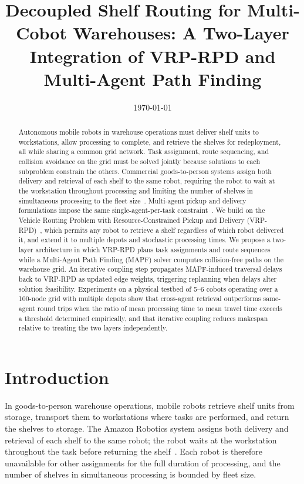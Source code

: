 \documentclass{article}
\title{Decoupled Shelf Routing for Multi-Cobot Warehouses: A Two-Layer Integration of VRP-RPD and Multi-Agent Path Finding}
\date{\today}
\begin{document}
\maketitle

\begin{abstract}

Autonomous mobile robots in warehouse operations must deliver shelf units to
workstations, allow processing to complete, and retrieve the shelves for
redeployment, all while sharing a common grid network. Task assignment, route
sequencing, and collision avoidance on the grid must be solved jointly because
solutions to each subproblem constrain the others. Commercial goods-to-person
systems assign both delivery and retrieval of each shelf to the same robot,
requiring the robot to wait at the workstation throughout processing and limiting
the number of shelves in simultaneous processing to the fleet
size~\cite{kiva_patent_2014}. Multi-agent pickup and delivery formulations
impose the same single-agent-per-task constraint~\cite{ma2017lifelong}. We build
on the Vehicle Routing Problem with Resource-Constrained Pickup and Delivery
(VRP-RPD)~\cite{vrp_rpd_gecco_2026}, which permits any robot to retrieve a
shelf regardless of which robot delivered it, and extend it to multiple depots
and stochastic processing times. We propose a two-layer architecture in which
VRP-RPD plans task assignments and route sequences while a Multi-Agent Path
Finding (MAPF) solver computes collision-free paths on the warehouse grid. An
iterative coupling step propagates MAPF-induced traversal delays back to VRP-RPD
as updated edge weights, triggering replanning when delays alter solution
feasibility. Experiments on a physical testbed of 5--6 cobots operating over a
100-node grid with multiple depots show that cross-agent retrieval outperforms
same-agent round trips when the ratio of mean processing time to mean travel time
exceeds a threshold determined empirically, and that iterative coupling reduces
makespan relative to treating the two layers independently.

\end{abstract}

\section{Introduction}

In goods-to-person warehouse operations, mobile robots retrieve shelf units from
storage, transport them to workstations where tasks are performed, and return
the shelves to storage. The Amazon Robotics system assigns both delivery and
retrieval of each shelf to the same robot; the robot waits at the workstation
throughout the task before returning the shelf~\cite{kiva_patent_2014}. Each
robot is therefore unavailable for other assignments for the full duration of
processing, and the number of shelves in simultaneous processing is bounded by
fleet size.
\end{document}
